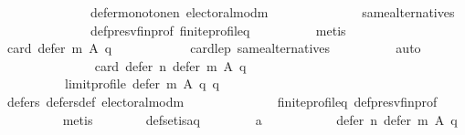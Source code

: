 \begin{isabellebody}
\ \ \ \ \ \ \ \ \ \ \ \ \ \ defer{\isacharunderscore}{\kern0pt}monotone{\isacharunderscore}{\kern0pt}n\ electoral{\isacharunderscore}{\kern0pt}mod{\isacharunderscore}{\kern0pt}m\isanewline
\ \ \ \ \ \ \ \ \ \ \ \ \ \ same{\isacharunderscore}{\kern0pt}alternatives\isanewline
\ \ \ \ \ \ \ \ \ \ \ \ \ \ def{\isacharunderscore}{\kern0pt}presv{\isacharunderscore}{\kern0pt}fin{\isacharunderscore}{\kern0pt}prof\ finite{\isacharunderscore}{\kern0pt}profile{\isacharunderscore}{\kern0pt}q\isanewline
\ \ \ \ \ \ \ \ \isamarkupfalse%
\ metis\isanewline
\ \ \ \ \ \ \isamarkupfalse%
\ {\isachardoublequoteopen}card\ {\isacharparenleft}{\kern0pt}defer\ m\ A\ q{\isacharparenright}{\kern0pt}\ {\isasymge}\ {}{\isachardoublequoteclose}\isanewline
\ \ \ \ \ \ \ \ \isamarkupfalse%
\ card{\isacharunderscore}{\kern0pt}le{\isacharunderscore}{\kern0pt}{}{\isacharunderscore}{\kern0pt}p\ same{\isacharunderscore}{\kern0pt}alternatives\isanewline
\ \ \ \ \ \ \ \ \isamarkupfalse%
\ auto\isanewline
\ \ \ \ \ \ \isamarkupfalse%
\isanewline
\ \ \ \ \ \ \ \ {\isachardoublequoteopen}card\ {\isacharparenleft}{\kern0pt}defer\ n\ {\isacharparenleft}{\kern0pt}defer\ m\ A\ q{\isacharparenright}{\kern0pt}\isanewline
\ \ \ \ \ \ \ \ \ \ {\isacharparenleft}{\kern0pt}limit{\isacharunderscore}{\kern0pt}profile\ {\isacharparenleft}{\kern0pt}defer\ m\ A\ q{\isacharparenright}{\kern0pt}\ q{\isacharparenright}{\kern0pt}{\isacharparenright}{\kern0pt}\ {\isacharequal}{\kern0pt}\ {}{\isachardoublequoteclose}\isanewline
\ \ \ \ \ \ \ \ \isamarkupfalse%
\ defers{\isacharunderscore}{\kern0pt}{}\ defers{\isacharunderscore}{\kern0pt}def\ electoral{\isacharunderscore}{\kern0pt}mod{\isacharunderscore}{\kern0pt}m\isanewline
\ \ \ \ \ \ \ \ \ \ \ \ \ \ finite{\isacharunderscore}{\kern0pt}profile{\isacharunderscore}{\kern0pt}q\ def{\isacharunderscore}{\kern0pt}presv{\isacharunderscore}{\kern0pt}fin{\isacharunderscore}{\kern0pt}prof\isanewline
\ \ \ \ \ \ \ \ \isamarkupfalse%
\ metis\isanewline
\ \ \ \ \ \ \isamarkupfalse%
\ def{\isacharunderscore}{\kern0pt}set{\isacharunderscore}{\kern0pt}is{\isacharunderscore}{\kern0pt}a{\isacharunderscore}{\kern0pt}q{\isacharcolon}{\kern0pt}\isanewline
\ \ \ \ \ \ \ \ {\isachardoublequoteopen}{\isacharbraceleft}{\kern0pt}a{\isacharbraceright}{\kern0pt}\ {\isacharequal}{\kern0pt}\isanewline
\ \ \ \ \ \ \ \ \ \ defer\ n\ {\isacharparenleft}{\kern0pt}defer\ m\ A\ q{\isacharparenright}{\kern0pt}\isanewline

\end{isabellebody}
